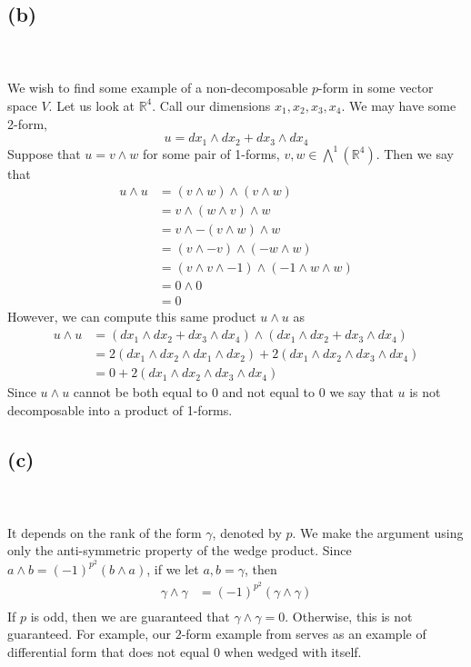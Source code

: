 \documentclass{article}
\theoremstyle{definition}
\begin{document}
\subsection*{(b)}
 \\\\
We wish to find some example of a non-decomposable $p$-form in some vector space $V$.
Let us look at $\mathbb{R}^4$. Call our dimensions $x_1, x_2, x_3, x_4$. We may have some 2-form,
\[
    u = dx_1 \wedge dx_2 + dx_3 \wedge dx_4
\]
Suppose that $u = v \wedge w$ for some pair of 1-forms, $v,w \in \bigwedge^1(\mathbb{R}^4)$.
Then we say that \begin{align*}
    u \wedge u &= (v \wedge w) \wedge (v \wedge w) \\
    &= v \wedge (w \wedge v) \wedge w \\
    &= v \wedge -(v \wedge w) \wedge w \\
    &= (v \wedge -v) \wedge (-w \wedge w) \\
    &= (v \wedge v \wedge -1) \wedge (-1 \wedge w \wedge w) \\
    &= 0 \wedge 0\\
    &= 0
\end{align*}
However, we can compute this same product $u \wedge u$ as
\begin{align*}
    u \wedge u &= (dx_1 \wedge dx_2 + dx_3 \wedge dx_4) \wedge (dx_1 \wedge dx_2 + dx_3 \wedge dx_4)\\
    &= 2(dx_1 \wedge dx_2 \wedge dx_1 \wedge dx_2) + 2(dx_1 \wedge dx_2 \wedge dx_3 \wedge dx_4) \\
    &= 0 + 2(dx_1 \wedge dx_2 \wedge dx_3 \wedge dx_4)
\end{align*}
Since $u \wedge u$ cannot be both equal to 0 and not equal to 0 we say that $u$ is not decomposable into a product of 1-forms.
\subsection*{(c)}
\\\\
It depends on the rank of the form $\gamma$, denoted by $p$. We make the argument
 using only the anti-symmetric property of the wedge product.
Since $a \wedge b = (-1)^{p^2}(b \wedge a)$, if we let $a,b = \gamma$, then
\begin{align*}
    \gamma \wedge \gamma &= (-1)^{p^2}(\gamma \wedge \gamma) \\
\end{align*}
If $p$ is odd, then we are guaranteed that $\gamma \wedge \gamma = 0$.
Otherwise, this is not guaranteed. For example, our $2$-form example from 
serves as an example of differential form that does not equal 0 when wedged with itself.
\end{document}
